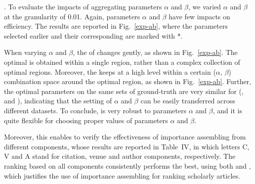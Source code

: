 




.
To evaluate the impacts of aggregating parameters $\alpha$ and $\beta$, we varied $\alpha$ and $\beta$ at the granularity of 0.01. Again, parameters $\alpha$ and $\beta$ have few impacts on efficiency. The results are reported in Fig.~\ref{exp-ab}, where the parameters selected earlier and their corresponding \PairAcc are marked with $*$.

When varying $\alpha$ and $\beta$, the \PairAcc of \ensemblerank changes gently, as shown in Fig.~\ref{exp-ab}.
The optimal \PairAcc is obtained within a single region, rather than a complex collection of optimal regions.
%
Moreover, the \PairAcc keeps at a high level within a certain ($\alpha$, $\beta$) combination space around the optimal region, as shown in Fig.~\ref{exp-ab}.
%
Further, the optimal parameters on the same sets of ground-truth are very similar for (\aan, \aminer and \magdata), indicating that the setting of $\alpha$ and $\beta$ can be easily transferred across different datasets.
To conclude, \ensemblerank is very robust to parameters $\alpha$ and $\beta$, and it is quite flexible for choosing proper values of parameters $\alpha$ and $\beta$.

Moreover, this enables to verify the effectiveness of importance assembling from different components, whose results are reported in Table~IV, in which letters C, V and A stand for citation, venue and author components, respectively.
The ranking based on all components consistently performs the best, using both \recom and \fcita, which justifies the use of importance assembling for ranking scholarly articles.


